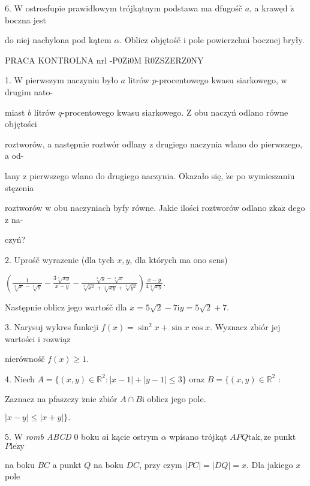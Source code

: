 \documentclass[a4paper,12pt]{article}
\begin{document}
6. $\mathrm{W}$ ostrosfupie prawidlowym trójkątnym podstawa ma dfugośč $a$, a krawęd $\acute{\mathrm{z}}$ boczna jest

do niej nachylona pod kątem $\alpha$. Oblicz objętośč $\mathrm{i}$ pole powierzchni bocznej bryły.




PRACA KONTROLNA nrl -P0Zi0M R0ZSZERZ0NY

1. $\mathrm{W}$ pierwszym naczyniu było $a$ litrów $p$-procentowego kwasu siarkowego, $\mathrm{w}$ drugim nato-

miast $b$ litrów $q$-procentowego kwasu siarkowego. $\mathrm{Z}$ obu naczyń odlano równe objętości

roztworów, a następnie roztwór odlany $\mathrm{z}$ drugiego naczynia wlano do pierwszego, a od-

lany $\mathrm{z}$ pierwszego wlano do drugiego naczynia. Okazało się, $\dot{\mathrm{z}}\mathrm{e}$ po wymieszaniu stęzenia

roztworów $\mathrm{w}$ obu naczyniach byfy równe. Jakie ilości roztworów odlano $\mathrm{z}\mathrm{k}\mathrm{a}\dot{\mathrm{z}}$ dego $\mathrm{z}$ na-

czyń?

2. Uprośč wyrazenie (dla tych $x, y$, dla których ma ono sens)

$(\displaystyle \frac{1}{\sqrt[3]{x}-\sqrt[3]{y}}-\frac{3\sqrt[3]{xy}}{x-y}-\frac{\sqrt[3]{y}-\sqrt[3]{x}}{\sqrt[3]{x^{2}}+\sqrt[3]{xy}+\sqrt[3]{y^{2}}})\frac{x-y}{4\sqrt[3]{xy}}.$

Następnie oblicz jego wartośč dla $x=5\sqrt{2}-7\mathrm{i}y=5\sqrt{2}+7.$

3. Narysuj wykres funkcji $f(x)=\sin^{2}x+\sin x\cos x$. Wyznacz zbiór jej wartości $\mathrm{i}$ rozwiąz

nierównośč $f(x)\geq 1.$

4. Niech $A=\{(x,y)\in \mathbb{R}^{2}:|x-1|+|y-1|\leq 3\}$ oraz $B=\{(x,y)\in \mathbb{R}^{2}$ :

Zaznacz na pfaszczy $\acute{\mathrm{z}}\mathrm{n}\mathrm{i}\mathrm{e}$ zbiór $A\cap B\mathrm{i}$ oblicz jego pole.

$|x-y|\leq|x+y|\}.$

5. $\mathrm{W}$ {\it romb ABCD} $0$ boku $a\mathrm{i}$ kącie ostrym $\alpha$ wpisano trójkąt $APQ\mathrm{t}\mathrm{a}\mathrm{k}, \dot{\mathrm{z}}\mathrm{e}$ punkt $P\mathrm{l}\mathrm{e}\dot{\mathrm{z}}\mathrm{y}$

na boku $BC$ a punkt $Q$ na boku $DC$, przy czym $|PC|=|DQ|=x$. Dla jakiego $x$ pole
\end{document}
